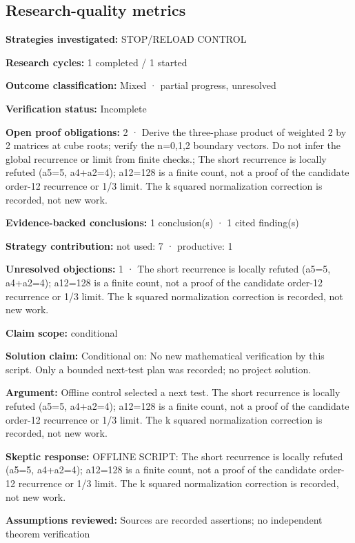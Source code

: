 \documentclass[11pt]{article}
\begin{document}
\subsection{Research-quality metrics}
\textbf{Strategies investigated:} STOP/RELOAD CONTROL\par
\textbf{Research cycles:} 1 completed / 1 started\par
\textbf{Outcome classification:} Mixed · partial progress, unresolved\par
\textbf{Verification status:} Incomplete\par
\textbf{Open proof obligations:} 2 · Derive the three-phase product of weighted 2 by 2 matrices at cube roots; verify the n=0,1,2 boundary vectors. Do not infer the global recurrence or limit from finite checks.; The short recurrence is locally refuted (a5=5, a4+a2=4); a12=128 is a finite count, not a proof of the candidate order-12 recurrence or 1/3 limit. The k squared normalization correction is recorded, not new work.\par
\textbf{Evidence-backed conclusions:} 1 conclusion(s) · 1 cited finding(s)\par
\textbf{Strategy contribution:} not used: 7 · productive: 1\par
\textbf{Unresolved objections:} 1 · The short recurrence is locally refuted (a5=5, a4+a2=4); a12=128 is a finite count, not a proof of the candidate order-12 recurrence or 1/3 limit. The k squared normalization correction is recorded, not new work.\par
\textbf{Claim scope:} conditional\par
\textbf{Solution claim:} Conditional on: No new mathematical verification by this script. Only a bounded next-test plan was recorded; no project solution.\par
\textbf{Argument:} Offline control selected a next test. The short recurrence is locally refuted (a5=5, a4+a2=4); a12=128 is a finite count, not a proof of the candidate order-12 recurrence or 1/3 limit. The k squared normalization correction is recorded, not new work.\par
\textbf{Skeptic response:} OFFLINE SCRIPT: The short recurrence is locally refuted (a5=5, a4+a2=4); a12=128 is a finite count, not a proof of the candidate order-12 recurrence or 1/3 limit. The k squared normalization correction is recorded, not new work.\par
\textbf{Assumptions reviewed:} Sources are recorded assertions; no independent theorem verification\par
\end{document}
